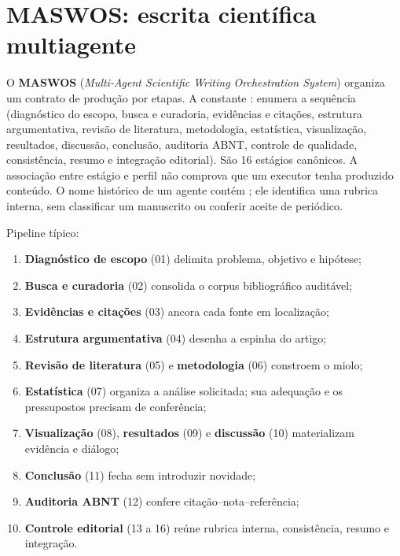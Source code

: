 \clearpage
\section{MASWOS: escrita científica multiagente}


\begin{descricao}
O \textbf{MASWOS} (\textit{Multi-Agent Scientific Writing Orchestration System})
organiza um contrato de produção por etapas. A constante
: enumera a sequência (diagnóstico do escopo, busca e curadoria,
evidências e citações, estrutura argumentativa, revisão de literatura, metodologia,
estatística, visualização, resultados, discussão, conclusão, auditoria ABNT,
controle de qualidade, consistência, resumo e integração editorial). São
16 estágios canônicos. A associação entre estágio e perfil não comprova que
um executor tenha produzido conteúdo. O nome histórico de um agente contém
; ele identifica uma rubrica interna, sem classificar um
manuscrito ou conferir aceite de periódico.
\end{descricao}

\begin{metodo}
Pipeline típico:
\begin{enumerate}[leftmargin=1.4em,itemsep=1pt]
  \item \textbf{Diagnóstico de escopo} (01) delimita problema, objetivo e hipótese;
  \item \textbf{Busca e curadoria} (02) consolida o corpus bibliográfico auditável;
  \item \textbf{Evidências e citações} (03) ancora cada fonte em localização;
  \item \textbf{Estrutura argumentativa} (04) desenha a espinha do artigo;
  \item \textbf{Revisão de literatura} (05) e \textbf{metodologia} (06) constroem
        o miolo;
  \item \textbf{Estatística} (07) organiza a análise solicitada; sua adequação e os pressupostos precisam de conferência;
  \item \textbf{Visualização} (08), \textbf{resultados} (09) e \textbf{discussão}
        (10) materializam evidência e diálogo;
  \item \textbf{Conclusão} (11) fecha sem introduzir novidade;
  \item \textbf{Auditoria ABNT} (12) confere citação–nota–referência;
  \item \textbf{Controle editorial} (13 a 16) reúne rubrica interna, consistência, resumo e integração.
\end{enumerate}
\end{metodo}

